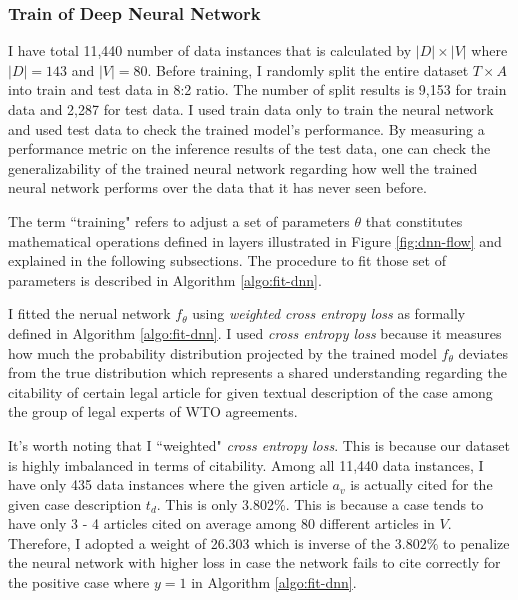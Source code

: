 \documentclass[12pt,letterpaper]{article}
\begin{document}
\subsubsection{Train of Deep Neural Network}

I have total 11,440 number of data instances that is calculated by $|D| \times |V|$ where $|D| = 143$ and $|V|=80$.
Before training, I randomly split the entire dataset $T \times A$ into train and test data in 8:2 ratio.
The number of split results is 9,153 for train data and 2,287 for test data.
I used train data only to train the neural network and used test data to check the trained model's performance.
By measuring a performance
metric on the inference results of the test data, one can check the generalizability of the trained neural network regarding
how well the trained neural network performs over the data that it has never seen before.
 
The term ``training" refers to adjust a set of parameters $\theta$
that constitutes mathematical operations defined in layers illustrated in Figure \ref{fig:dnn-flow} and explained in the following subsections.
The procedure to fit those set of parameters is described in Algorithm \ref{algo:fit-dnn}.



I fitted the nerual network $f_\theta$ using \textit{weighted cross entropy loss} as formally defined in Algorithm \ref{algo:fit-dnn}.
I used \textit{cross entropy loss} because it measures how much the probability distribution projected by the trained model $f_\theta$
deviates from the true distribution which represents a shared understanding regarding the citability of certain legal article for given textual description of the case
among the group of legal experts of WTO agreements.

It's worth noting that I ``weighted" \textit{cross entropy loss}. This is because
our dataset is highly imbalanced in terms of citability.
Among all 11,440 data instances, I have only 435 data instances where the given article $a_v$ is actually cited for the given case description $t_d$. This is only 3.802\%.
This is because a case tends to have only 3 - 4 articles cited on average among 80 different articles in $V$.
Therefore, I adopted a weight of 26.303 which is inverse of the $3.802\%$ to penalize the neural network with higher loss in case the network fails to cite correctly for the positive case where $y = 1$ in Algorithm \ref{algo:fit-dnn}.
 
\end{document}
